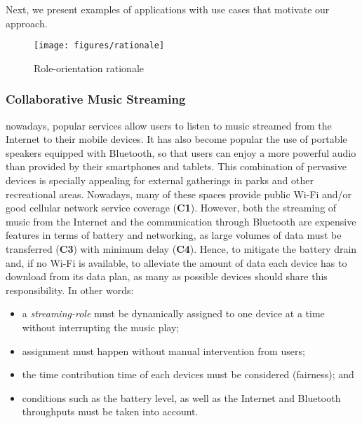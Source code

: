 Next, we present examples of applications with use cases that motivate our approach.

\begin{figure*}[t!]
	\centering
	\texttt{[image: figures/rationale]}
	\caption{Role-orientation rationale}
	\label{fig:rationale}
\end{figure*}

\subsubsection{Collaborative Music Streaming}

nowadays, popular services allow users to listen to music streamed from the Internet to their mobile devices. It has also become popular the use of portable speakers equipped with Bluetooth, so that users can enjoy a more powerful audio than provided by their smartphones and tablets. This combination of pervasive devices is specially appealing for external gatherings in parks and other recreational areas. Nowadays, many of these spaces provide public Wi-Fi and/or good cellular network service coverage (\textbf{C1}). However, both the streaming of music from the Internet and the communication through Bluetooth are expensive features in terms of battery and networking, as large volumes of data must be transferred (\textbf{C3}) with minimum delay (\textbf{C4}). Hence, to mitigate the battery drain and, if no Wi-Fi is available, to alleviate the amount of data each device has to download from its data plan, as many as possible devices should  share this responsibility. In other words:

\begin{itemize}
	
	\item a \textit{streaming-role} must be dynamically assigned to one device at a time without interrupting the music play;
	
	\item assignment must happen without manual intervention from users;
	
	\item the time contribution time of each devices must be considered (fairness); and
	
	\item conditions such as the battery level, as well as the Internet and Bluetooth throughputs must be taken into account.
	
\end{itemize}




